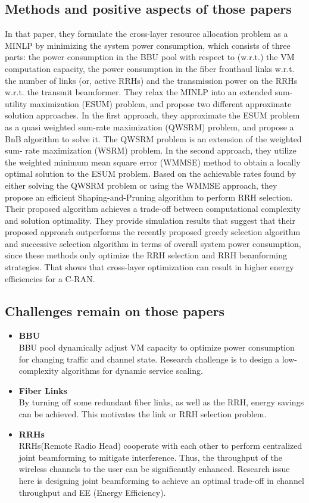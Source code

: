 \documentclass{article}
\begin{document}
\subsection{Methods and positive aspects of those papers}
In that paper, they formulate the cross-layer resource allocation problem as a MINLP by minimizing the system power consumption, which consists of three parts: the power consumption in the BBU pool with respect to (w.r.t.) the VM computation capacity, the power consumption in the fiber fronthaul links w.r.t. the number of links (or, active RRHs) and the transmission power on the RRHs w.r.t. the transmit beamformer. They relax the MINLP into an extended sum-utility maximization (ESUM) problem, and propose two different approximate solution approaches. In the first approach, they approximate the ESUM problem as a quasi weighted sum-rate maximization (QWSRM) problem, and propose a BnB algorithm to solve it. The QWSRM problem is an extension of the weighted sum- rate maximization (WSRM) problem. In the second approach, they utilize the weighted minimum mean square error (WMMSE) method to obtain a locally optimal solution to the ESUM problem. Based on the achievable rates found by either solving the QWSRM problem or using the WMMSE approach, they propose an efficient Shaping-and-Pruning algorithm to perform RRH selection. Their proposed algorithm achieves a trade-off between computational complexity and solution optimality. They provide simulation results that suggest that their proposed approach outperforms the recently proposed greedy selection algorithm and successive selection algorithm in terms of overall system power consumption, since these methods only optimize the RRH selection and RRH beamforming strategies. That shows that cross-layer optimization can result in higher energy efficiencies for a C-RAN.
\subsection{Challenges remain on those papers}
\begin{itemize}
  \item \textbf{BBU}\\
    BBU pool dynamically adjust VM capacity to optimize power consumption for changing traffic and channel state. Research challenge is to design a low-complexity algorithms for dynamic service scaling.
  \item \textbf{Fiber Links}\\
    By turning off some redundant fiber links, as well as the RRH, energy savings can be achieved. This motivates the link or RRH selection problem.
  \item \textbf{RRHs}\\
    RRHs(Remote Radio Head) cooperate with each other to perform centralized joint beamforming to mitigate interference. Thus, the throughput of the wireless channels to the user can be significantly enhanced. Research issue here is designing joint beamforming to achieve an optimal trade-off in channel throughput and EE (Energy Efficiency).
\end{itemize}
\end{document}
